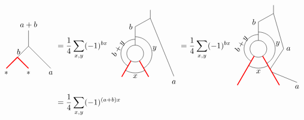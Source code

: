 	\begin{align}
		\begin{tikzpicture}[scale=0.7,baseline=(current bounding box.center)]
			\draw[] (0,0) -- (0,1) node[pos=1,above]{$a+b$};
			\draw[] (0,0) -- (-0.707107,-0.707107) node [pos=.5,left] {$b$};
			\draw[red,line width=0.4mm] (-0.707107,-0.707107) -- (-1.41421,-1.41421);
			\draw[red,line width=0.4mm] (-0.707107,-0.707107) -- (0,-1.41421);
			\draw (0,0) -- (0.707107,-0.707107);
			\draw (0.707107,-0.707107) -- (1.41421,-1.41421);
			\node at (-1.41421,-1.7) {$*$};
			\node at (0,-1.7) {$*$};
			\node at (1.41421,-1.7) {$a$};
		\end{tikzpicture}&=
		\frac{1}{4}\sum_{x,y}(-1)^{bx}
		\begin{tikzpicture}[scale=.75,baseline=(current bounding box.center)]
			\draw (0,0) circle (0.5cm);
			\draw[red,line width=0.4mm]
			\foreach \a in {-60, -120} {
				(\a:0.5) -- (\a:1.6)
			};
			\draw[] (90:0.5) -- (90:1.6);
			\draw ([shift=(-60:1cm)]0,0) arc (-60:90:1cm);
			\draw ([shift=(-120:1.15cm)]0,0) arc (-120:-60:1.15cm);
			\draw ([shift=(240:0.85cm)]0,0) arc (240:90:0.85cm);
			\draw[] (0,1.6) -- (0.9,2.1) node[pos=0,left] {$b$};
			\draw[] (0.9,2.1) -- (0.9,2.6);
			\draw (0.9,2.1) -- (2.3,-1.35);
			\node[rotate=60] at (-1,0.3) {$b+y$};
			\node at (1.15,0.3) {$y$};
			\node at (2.3,-1.7) {$a$};
			\node at (0,-1.35) {$x$};
		\end{tikzpicture}
		=\frac{1}{4}\sum_{x,y}(-1)^{bx}
		\begin{tikzpicture}[scale=.75,baseline=(current bounding box.center)]
		\draw (0,0) circle (0.5cm);
		\draw[red,line width=0.4mm]
		\foreach \a in {-60, -120} {
			(\a:0.5) -- (\a:2.5)
		};
		\draw[] (90:0.5) -- (90:1.6);
		\draw ([shift=(-60:1cm)]0,0) arc (-60:90:1cm);
		\draw ([shift=(-120:1.15cm)]0,0) arc (-120:-60:1.15cm);
		\draw ([shift=(240:0.85cm)]0,0) arc (240:90:0.85cm);
		\draw[] (0,1.6) -- (0.9,2.1) node[pos=0,left] {$b$};
		\draw[] (0.9,2.1) -- (0.9,2.6);
		\draw (-60:1.6) -- (2.3,-2) node[pos=1,below] {$a$};
		\draw (-60:1.4) --(1.5,0) node[right]{$a$} -- (0.9,2.1);
		\node[rotate=60] at (-1,0.3) {$b+y$};
		\node at (1.15,0.3) {$y$};
		\node at (0,-1.35) {$x$};
		\end{tikzpicture}
		\\
		&=\frac{1}{4}\sum_{x,y}(-1)^{(a+b)x}
		\begin{tikzpicture}[scale=.75,baseline=(current bounding box.center)]

\end{tikzpicture}
\end{align}
